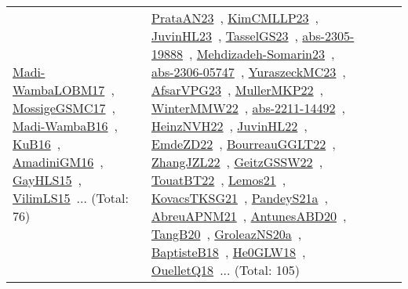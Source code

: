 {\begin{longtable}{lp{3cm}>{\raggedright\arraybackslash}p{6cm}>{\raggedright\arraybackslash}p{6cm}>{\raggedright\arraybackslash}p{8cm}}
\href{works/Madi-WambaLOBM17.pdf}{Madi-WambaLOBM17}~\cite{Madi-WambaLOBM17}, \href{works/MossigeGSMC17.pdf}{MossigeGSMC17}~\cite{MossigeGSMC17}, \href{works/Madi-WambaB16.pdf}{Madi-WambaB16}~\cite{Madi-WambaB16}, \href{works/KuB16.pdf}{KuB16}~\cite{KuB16}, \href{works/AmadiniGM16.pdf}{AmadiniGM16}~\cite{AmadiniGM16}, \href{works/GayHLS15.pdf}{GayHLS15}~\cite{GayHLS15}, \href{works/VilimLS15.pdf}{VilimLS15}~\cite{VilimLS15}... (Total: 76) & \href{works/PrataAN23.pdf}{PrataAN23}~\cite{PrataAN23}, \href{works/KimCMLLP23.pdf}{KimCMLLP23}~\cite{KimCMLLP23}, \href{works/JuvinHL23.pdf}{JuvinHL23}~\cite{JuvinHL23}, \href{works/TasselGS23.pdf}{TasselGS23}~\cite{TasselGS23}, \href{works/abs-2305-19888.pdf}{abs-2305-19888}~\cite{abs-2305-19888}, \href{works/Mehdizadeh-Somarin23.pdf}{Mehdizadeh-Somarin23}~\cite{Mehdizadeh-Somarin23}, \href{works/abs-2306-05747.pdf}{abs-2306-05747}~\cite{abs-2306-05747}, \href{works/YuraszeckMC23.pdf}{YuraszeckMC23}~\cite{YuraszeckMC23}, \href{works/AfsarVPG23.pdf}{AfsarVPG23}~\cite{AfsarVPG23}, \href{works/MullerMKP22.pdf}{MullerMKP22}~\cite{MullerMKP22}, \href{works/WinterMMW22.pdf}{WinterMMW22}~\cite{WinterMMW22}, \href{works/abs-2211-14492.pdf}{abs-2211-14492}~\cite{abs-2211-14492}, \href{works/HeinzNVH22.pdf}{HeinzNVH22}~\cite{HeinzNVH22}, \href{works/JuvinHL22.pdf}{JuvinHL22}~\cite{JuvinHL22}, \href{works/EmdeZD22.pdf}{EmdeZD22}~\cite{EmdeZD22}, \href{works/BourreauGGLT22.pdf}{BourreauGGLT22}~\cite{BourreauGGLT22}, \href{works/ZhangJZL22.pdf}{ZhangJZL22}~\cite{ZhangJZL22}, \href{works/GeitzGSSW22.pdf}{GeitzGSSW22}~\cite{GeitzGSSW22}, \href{works/TouatBT22.pdf}{TouatBT22}~\cite{TouatBT22}, \href{works/Lemos21.pdf}{Lemos21}~\cite{Lemos21}, \href{works/KovacsTKSG21.pdf}{KovacsTKSG21}~\cite{KovacsTKSG21}, \href{works/PandeyS21a.pdf}{PandeyS21a}~\cite{PandeyS21a}, \href{works/AbreuAPNM21.pdf}{AbreuAPNM21}~\cite{AbreuAPNM21}, \href{works/AntunesABD20.pdf}{AntunesABD20}~\cite{AntunesABD20}, \href{works/TangB20.pdf}{TangB20}~\cite{TangB20}, \href{works/GroleazNS20a.pdf}{GroleazNS20a}~\cite{GroleazNS20a}, \href{works/BaptisteB18.pdf}{BaptisteB18}~\cite{BaptisteB18}, \href{works/He0GLW18.pdf}{He0GLW18}~\cite{He0GLW18}, \href{works/OuelletQ18.pdf}{OuelletQ18}~\cite{OuelletQ18}... (Total: 105)\\

\end{longtable}}
